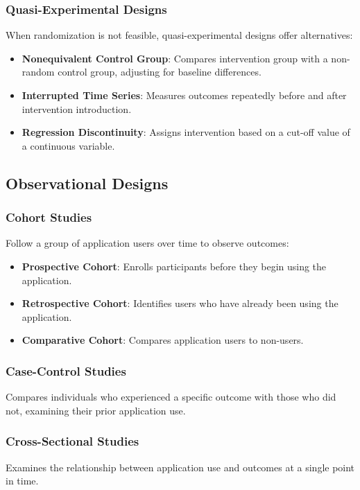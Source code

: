 \subsubsection{Quasi-Experimental Designs}
When randomization is not feasible, quasi-experimental designs offer alternatives:

\begin{itemize}
    \item \textbf{Nonequivalent Control Group}: Compares intervention group with a non-random control group, adjusting for baseline differences.
    \item \textbf{Interrupted Time Series}: Measures outcomes repeatedly before and after intervention introduction.
    \item \textbf{Regression Discontinuity}: Assigns intervention based on a cut-off value of a continuous variable.
\end{itemize}

\subsection{Observational Designs}
\subsubsection{Cohort Studies}
Follow a group of application users over time to observe outcomes:

\begin{itemize}
    \item \textbf{Prospective Cohort}: Enrolls participants before they begin using the application.
    \item \textbf{Retrospective Cohort}: Identifies users who have already been using the application.
    \item \textbf{Comparative Cohort}: Compares application users to non-users.
\end{itemize}

\subsubsection{Case-Control Studies}
Compares individuals who experienced a specific outcome with those who did not, examining their prior application use.

\subsubsection{Cross-Sectional Studies}
Examines the relationship between application use and outcomes at a single point in time.

